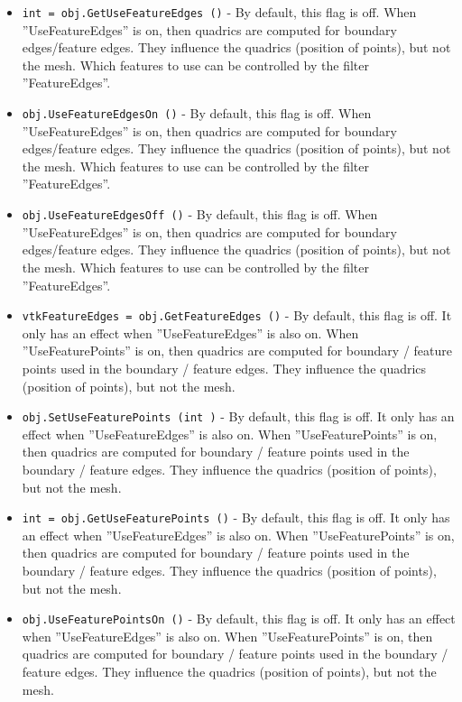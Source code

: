 \begin{itemize}
\item  \verb|int = obj.GetUseFeatureEdges ()| -  By default, this flag is off.  When ''UseFeatureEdges'' is on, then
 quadrics are computed for boundary edges/feature edges.  They influence
 the quadrics (position of points), but not the mesh.  Which features to
 use can be controlled by the filter ''FeatureEdges''.

\item  \verb|obj.UseFeatureEdgesOn ()| -  By default, this flag is off.  When ''UseFeatureEdges'' is on, then
 quadrics are computed for boundary edges/feature edges.  They influence
 the quadrics (position of points), but not the mesh.  Which features to
 use can be controlled by the filter ''FeatureEdges''.

\item  \verb|obj.UseFeatureEdgesOff ()| -  By default, this flag is off.  When ''UseFeatureEdges'' is on, then
 quadrics are computed for boundary edges/feature edges.  They influence
 the quadrics (position of points), but not the mesh.  Which features to
 use can be controlled by the filter ''FeatureEdges''.

\item  \verb|vtkFeatureEdges = obj.GetFeatureEdges ()| -  By default, this flag is off.  It only has an effect when
 ''UseFeatureEdges'' is also on.  When ''UseFeaturePoints'' is on, then
 quadrics are computed for boundary / feature points used in the boundary
 / feature edges.  They influence the quadrics (position of points), but
 not the mesh.

\item  \verb|obj.SetUseFeaturePoints (int )| -  By default, this flag is off.  It only has an effect when
 ''UseFeatureEdges'' is also on.  When ''UseFeaturePoints'' is on, then
 quadrics are computed for boundary / feature points used in the boundary
 / feature edges.  They influence the quadrics (position of points), but
 not the mesh.

\item  \verb|int = obj.GetUseFeaturePoints ()| -  By default, this flag is off.  It only has an effect when
 ''UseFeatureEdges'' is also on.  When ''UseFeaturePoints'' is on, then
 quadrics are computed for boundary / feature points used in the boundary
 / feature edges.  They influence the quadrics (position of points), but
 not the mesh.

\item  \verb|obj.UseFeaturePointsOn ()| -  By default, this flag is off.  It only has an effect when
 ''UseFeatureEdges'' is also on.  When ''UseFeaturePoints'' is on, then
 quadrics are computed for boundary / feature points used in the boundary
 / feature edges.  They influence the quadrics (position of points), but
 not the mesh.


\end{itemize}
